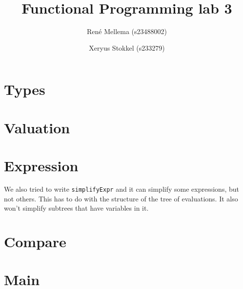 \documentclass[a4paper]{article}
\title{Functional Programming lab 3}
\author{Ren\'e Mellema (s23488002) \and Xeryus Stokkel (s233279)}
\begin{document}
\maketitle

\section{Types}



\section{Valuation}



\section{Expression}
We also tried to write \lstinline{simplifyExpr} and it can simplify some expressions, but not others. This has to do with the structure of the tree of evaluations. It also won't simplify subtrees that have variables in it. 



\section{Compare}



\section{Main}


\end{document}
